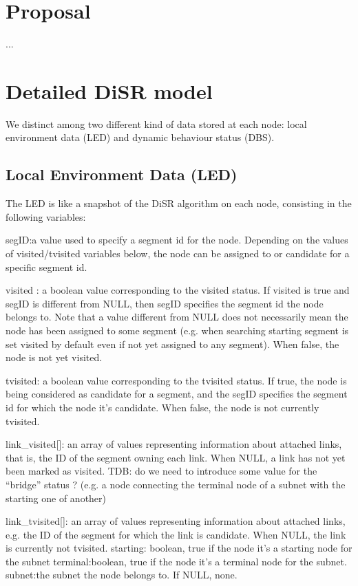 \documentclass[conference]{IEEEtran}
\begin{document}
\section{Proposal}
...

\section{Detailed DiSR model}
We distinct among two different kind of data stored at each node:
local environment data (LED) and dynamic behaviour status (DBS).

\subsection{Local Environment Data (LED)}

The LED is like a snapshot of the DiSR algorithm on each node,
consisting in the following variables:

segID:a value used to specify a segment id for the node. Depending on
the values of visited/tvisited variables below, the node can be
assigned to or candidate for a specific segment id.  

visited : a boolean value corresponding to the visited status. If visited is true
and segID is different from NULL, then segID specifies the segment id
the node belongs to. Note that a value different from NULL does not
necessarily mean the node has been assigned to some segment (e.g. when
searching starting segment is set visited by default even if not yet
assigned to any segment). When false, the node is not yet visited.

tvisited: a boolean value corresponding to the tvisited status. If
true, the node is being considered as candidate for a segment, and the
segID specifies the segment id for which the node it's candidate. When
false, the node is not currently tvisited.  

link\_visited[]: an array
of values representing information about attached links, that is, the
ID of the segment owning each link. When NULL, a link has not yet been
marked as visited. TDB: do we need to introduce some value for the
“bridge” status ? (e.g. a node connecting the terminal node of a
subnet with the starting one of another) 

link\_tvisited[]: an array of
values representing information about attached links, e.g. the ID of
the segment for which the link is candidate. When NULL, the link is
currently not tvisited.  starting: boolean, true if the node it's a
starting node for the subnet terminal:boolean, true if the node it's a
terminal node for the subnet.  subnet:the subnet the node belongs to.
If NULL, none.
\end{document}
